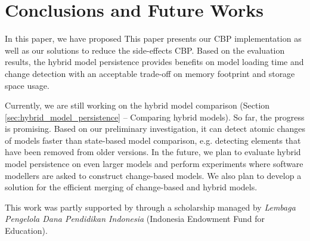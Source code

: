 \documentclass[sigplan,review,anonymous]{acmart}\settopmatter{printfolios=true,printccs=false,printacmref=false}
\begin{document}
\section{Conclusions and Future Works}
In this paper, we have proposed This paper presents our CBP implementation as well as our solutions to reduce the side-effects CBP. Based on the evaluation results, the hybrid model persistence provides benefits on model loading time and change detection with an acceptable trade-off on memory footprint and storage space usage. 

Currently, we are still working on the hybrid model comparison (Section \ref{sec:hybrid_model_persistence} -- Comparing hybrid models). So far, the progress is promising. Based on our preliminary investigation, it can detect atomic changes of models faster than state-based model comparison, e.g. detecting elements that have been removed from older versions. In the future, we plan to evaluate hybrid model persistence on even larger models and perform experiments where software modellers are asked to construct change-based models. We also plan to develop a solution for the efficient merging of change-based and hybrid models. 



\begin{acks}                            %
This work was partly supported by through a scholarship managed by \emph{Lembaga Pengelola Dana Pendidikan Indonesia} (Indonesia Endowment Fund for Education).
\end{acks}




\end{document}
